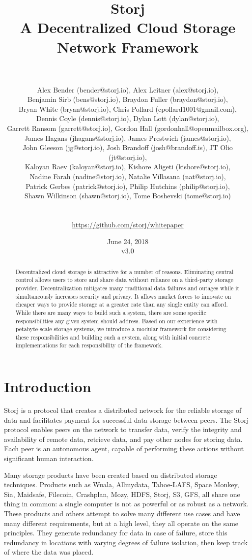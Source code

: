 \documentclass[a4paper,10pt]{article}
\title{\textbf{Storj\\A Decentralized Cloud Storage Network Framework}}
\author{\\
\parbox{\linewidth}{\centering\small
Alex Bender (bender@storj.io),
Alex Leitner (alex@storj.io),\\
Benjamin Sirb (bens@storj.io),
Braydon Fuller (braydon@storj.io),\\
Bryan White (bryan@storj.io),
Chris Pollard (cpollard1001@gmail.com),\\
Dennis Coyle (dennis@storj.io),
Dylan Lott (dylan@storj.io),\\
Garrett Ransom (garrett@storj.io),
Gordon Hall (gordonhall@openmailbox.org),\\
James Hagans (jhagans@storj.io),
James Prestwich (james@storj.io),\\
John Gleeson (jg@storj.io),
Josh Brandoff (josh@brandoff.is),
JT Olio (jt@storj.io),\\
Kaloyan Raev (kaloyan@storj.io),
Kishore Aligeti (kishore@storj.io),\\
Nadine Farah (nadine@storj.io),
Natalie Villasana (nat@storj.io),\\
Patrick Gerbes (patrick@storj.io),
Philip Hutchins (philip@storj.io),\\
Shawn Wilkinson (shawn@storj.io),
Tome Boshevski (tome@storj.io)}\\
\\
\small \url{https://github.com/storj/whitepaper}
}
\date {June 24, 2018 \\ v3.0}
\begin{document}
\maketitle

\begin{abstract}
Decentralized cloud storage is attractive for a number of reasons.
Eliminating central control allows users to store and share data without
reliance on a third-party storage provider.
Decentralization mitigates many traditional data failures and outages while it
simultaneously increases security and privacy.
It allows market forces to innovate on cheaper ways to provide storage at a
greater rate than any single entity can afford.
While there are many ways to build such a system, there are some specific
responsibilities any given system should address.
Based on our experience with petabyte-scale storage systems, we introduce a
modular framework for
  considering these responsibilities and building such a system,
  along with initial concrete implementations for each responsibility of the
    framework.
\end{abstract}

\section{Introduction}

Storj is a protocol that creates a distributed network for the reliable storage
of data and facilitates payment for successful data storage between peers. The
Storj protocol enables peers on the network to transfer data, verify the
integrity and availability of remote data, retrieve data, and pay other nodes
for storing data.
Each peer is an autonomous agent, capable of performing these actions without
significant human interaction.

Many storage products have been created based on distributed storage techniques.
Products such as
  Wuala,
  Allmydata,
  Tahoe-LAFS,
  Space Monkey,
  Sia,
  Maidsafe,
  Filecoin,
  Crashplan,
  Mozy,
  HDFS,
  Storj,
  S3,
  GFS,
all share one thing in common: a single computer is not as powerful or as
robust as a network.
These products and others attempt to solve many different use cases and have
many different requirements, but at a high level, they all operate on the same
principles.
They
  generate redundancy for data in case of failure,
  store this redundancy in locations with varying degrees of failure isolation,
  then keep track of where the data was placed.
\end{document}
